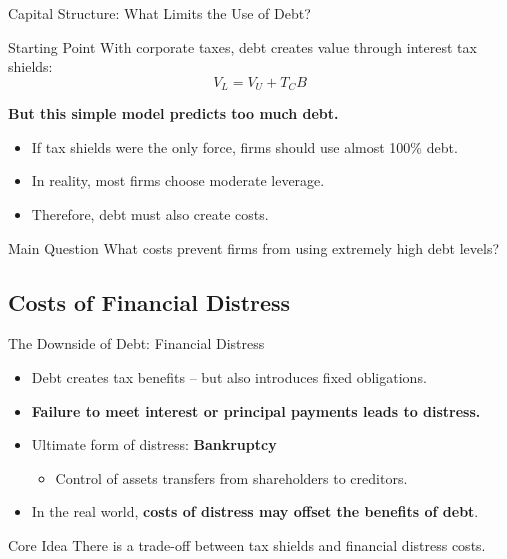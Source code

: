 
\begin{frame}{Capital Structure: What Limits the Use of Debt?}

\begin{block}{Starting Point}
With corporate taxes, debt creates value through interest tax shields:
\[
V_L = V_U + T_C B
\]
\end{block}

\vspace{0.3cm}

\textbf{But this simple model predicts too much debt.}

\begin{itemize}
    \item If tax shields were the only force, firms should use almost 100\% debt.
    \item In reality, most firms choose moderate leverage.
    \item Therefore, debt must also create costs.
\end{itemize}

\vfill

\begin{alertblock}{Main Question}
What costs prevent firms from using extremely high debt levels?
\end{alertblock}

\end{frame}

\subsection{Costs of Financial Distress}
\begin{frame}{The Downside of Debt: Financial Distress}
	
	\begin{itemize}
		\item Debt creates tax benefits -- but also introduces fixed obligations.
		\item \textbf{Failure to meet interest or principal payments leads to distress.}
		\item Ultimate form of distress: \textbf{Bankruptcy}
		\begin{itemize}
			\item Control of assets transfers from shareholders to creditors.
		\end{itemize}
		\item In the real world, \textbf{costs of distress may offset the benefits of debt}.
	\end{itemize}
	
	\vspace{0.2cm}
	\begin{alertblock}{Core Idea}
		There is a trade-off between tax shields and financial distress costs.
	\end{alertblock}
	
\end{frame}

